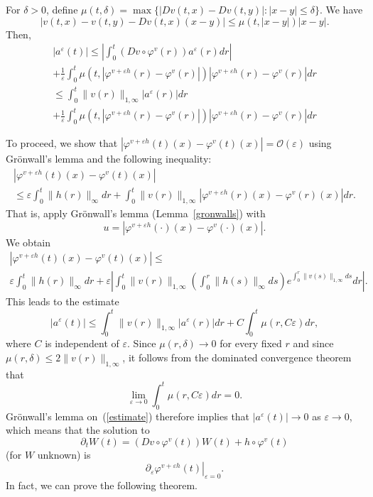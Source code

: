 \documentclass[a5paper,10pt,twoside]{article}
\theoremstyle{plain}
\theoremstyle{definition}
\theoremstyle{remark}
\begin{document}
For $\delta>0$, define $\mu(t,\delta)=\max\{|Dv(t,x)-Dv(t,y)|: |x-y|\leq \delta\}.$ We have
\[
|v(t,x)-v(t,y)-Dv(t,x)(x-y)|\leq \mu(t,|x-y|)|x-y|.
\]
Then,
%
\begin{multline*}
|a^\varepsilon(t)|\leq \left|\int_0^t\left(Dv\circ \varphi^v(r)\right)a^\varepsilon(r)dr\right|\\+\frac{1}{\varepsilon}\int_0^t \mu(t,|\varphi^{v+\varepsilon h}(r)-\varphi^v(r)|)\left|\varphi^{v+\varepsilon h}(r)-\varphi^v(r)\right|dr 
\end{multline*}
\begin{multline*}
\leq \int_0^t\|v(r)\|_{1,\infty}|a^\varepsilon(r)|dr\\+\frac{1}{\varepsilon}\int_0^t \mu(t,|\varphi^{v+\varepsilon h}(r)-\varphi^v(r)|)\left|\varphi^{v+\varepsilon h}(r)-\varphi^v(r)\right|dr 
\end{multline*}

To proceed, we show that $|\varphi^{v+\varepsilon h}(t)(x)-\varphi^v(t)(x)|=\mathcal{O}(\varepsilon)$ using Grön\-wall's lemma and the following inequality:
%
\begin{multline*}
|\varphi^{v+\varepsilon h}(t)(x)-\varphi^v(t)(x)|\\ \leq  \varepsilon\int_0^t\|h(r)\|_\infty dr+ \int_0^t\|v(r)\|_{1,\infty}\left|\varphi^{v+\varepsilon h}(r)(x)-\varphi^v(r)(x)\right|dr .
\end{multline*}
%
That is, apply Grönwall's lemma (Lemma~\ref{gronwalls}) with $$u=|\varphi^{v+\varepsilon h}(\cdot)(x)-\varphi^v(\cdot)(x)|.$$
We obtain
%
\begin{multline*}
|\varphi^{v+\varepsilon h}(t)(x)-\varphi^v(t)(x)|\leq \\  \varepsilon\int_0^t\|h(r)\|_\infty dr 
+ \varepsilon\left|\int_0^t\|v(r)\|_{1,\infty}\left(\int_0^r\|h(s)\|_\infty ds\right)e^{\int_0^r \|v(s)\|_{1,\infty}ds} dr\right|.
\end{multline*}
%
This leads to the estimate
%
\begin{equation}
\label{estimate}
|a^\varepsilon(t)|\leq \int_0^t\|v(r)\|_{1,\infty}|a^\varepsilon(r)|dr + C\int_0^t\mu(r,C\varepsilon)dr,
\end{equation}
%
where $C$ is independent of $\varepsilon$. Since $\mu(r,\delta)\to 0$ for every fixed $r$ and since $\mu(r,\delta)\leq 2\|v(r)\|_{1,\infty}$, it follows from the dominated convergence theorem that
\[
\lim_{\varepsilon\to 0}\int_0^t \mu(r,C\varepsilon)dr=0.
\]
Grönwall's lemma on~(\ref{estimate}) therefore implies that $|a^\varepsilon(t)|\to 0$ as $\varepsilon\to 0$, which means that the solution to
\[
\partial_t W(t)=\left(Dv\circ \varphi^v(t)\right)W(t)+h\circ \varphi^v(t)
\]
(for $W$ unknown) is
\[
\left.\partial_\varepsilon\varphi^{v+\varepsilon h}(t)\right|_{\varepsilon=0}.
\]
In fact, we can prove the following theorem.
\end{document}
